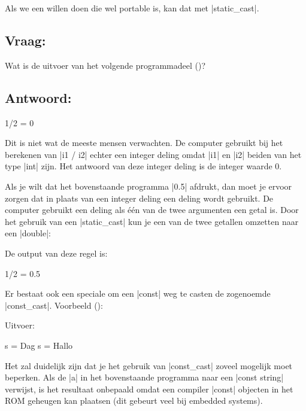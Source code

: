 \begin{cpplstShortInline}
Als we een  willen doen die wel portable is, kan dat met |static_cast|.

\subsection*{Vraag:}
Wat is de uitvoer van het volgende programmadeel ()?

\subsection*{Antwoord:}
\begin{coutput}
1/2 = 0
\end{coutput}

Dit is niet wat de meeste mensen verwachten.
De computer gebruikt bij het berekenen van |i1 / i2| echter een integer deling omdat |i1| en |i2| beiden van het type |int| zijn.
Het antwoord van deze integer deling is de integer waarde 0.

Als je wilt dat het bovenstaande programma |0.5| afdrukt, dan moet je ervoor zorgen dat in plaats van een integer deling een  deling wordt gebruikt.
De computer gebruikt een  deling als één van de twee argumenten een  getal is.
Door het gebruik van een |static_cast| kun je een van de twee getallen omzetten naar een |double|:

De output van deze regel is:
\begin{coutput}
1/2 = 0.5
\end{coutput}

Er bestaat ook een speciale  om een |const| weg te casten de zogenoemde |const_cast|\label{sec:const_cast}.
Voorbeeld ():

Uitvoer:
\begin{coutput}
s = Dag
s = Hallo
\end{coutput}

Het zal duidelijk zijn dat je het gebruik van |const_cast| zoveel mogelijk moet beperken.
Als de  |a| in het bovenstaande programma naar een |const string| verwijst, is het resultaat onbepaald omdat een compiler |const| objecten in het ROM geheugen kan plaatsen (dit gebeurt veel bij embedded systems).


\end{cpplstShortInline}
